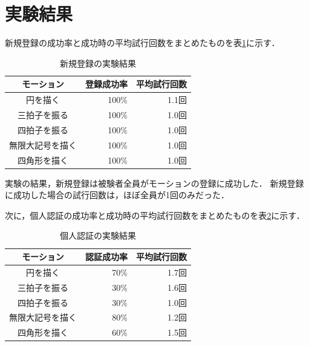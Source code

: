 \documentclass[11pt]{jreport}
\begin{document}
    \section{実験結果}
    新規登録の成功率と成功時の平均試行回数をまとめたものを表\ref{regResult}に示す．

    \begin{table}[htb]
        \begin{center}
            \caption{新規登録の実験結果}
            \label{regResult}
            \begin{tabular}{|c|r|r|} \hline
                モーション & 登録成功率 & 平均試行回数 \\ \hline \hline
                円を描く & 100\% & 1.1回 \\ \hline
                三拍子を振る & 100\% & 1.0回 \\ \hline
                四拍子を振る & 100\% & 1.0回 \\ \hline
                無限大記号を描く & 100\% & 1.0回 \\ \hline
                四角形を描く & 100\% & 1.0回 \\ \hline
            \end{tabular}
        \end{center}
    \end{table}

    実験の結果，新規登録は被験者全員がモーションの登録に成功した．
    新規登録に成功した場合の試行回数は，ほぼ全員が1回のみだった．

    次に，個人認証の成功率と成功時の平均試行回数をまとめたものを表\ref{authResult}に示す．

    \begin{table}[htb]
        \begin{center}
            \caption{個人認証の実験結果}
            \label{authResult}
            \begin{tabular}{|c|r|r|} \hline
                モーション & 認証成功率 & 平均試行回数 \\ \hline \hline
                円を描く & 70\% & 1.7回 \\ \hline
                三拍子を振る & 30\% & 1.6回 \\ \hline
                四拍子を振る & 30\% & 1.0回 \\ \hline
                無限大記号を描く & 80\% & 1.2回 \\ \hline
                四角形を描く & 60\% & 1.5回 \\ \hline
            \end{tabular}
        \end{center}
    \end{table}
\end{document}
